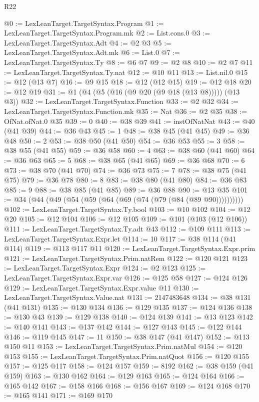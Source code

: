 \begin{lexlean}{R22}
\begin{coremodule}
@0 := LexLeanTarget.TargetSyntax.Program
@1 := LexLeanTarget.TargetSyntax.Program.mk
@2 := List.cons.{0}
@3 := LexLeanTarget.TargetSyntax.Adt
@4 := @2 @3
@5 := LexLeanTarget.TargetSyntax.Adt.mk
@6 := List.{0}
@7 := LexLeanTarget.TargetSyntax.Ty
@8 := @6 @7
@9 := @2 @8
@10 := @2 @7
@11 := LexLeanTarget.TargetSyntax.Ty.nat
@12 := @10 @11
@13 := List.nil.{0}
@15 := @12 (@13 @7)
@16 := @9 @15
@18 := @12 (@12 @15)
@19 := @12 @18
@20 := @12 @19
@31 := @1 (@4 (@5 (@16 (@9 @20 (@9 @18 (@13 @8))))) (@13 @3))
@32 := LexLeanTarget.TargetSyntax.Function
@33 := @2 @32
@34 := LexLeanTarget.TargetSyntax.Function.mk
@35 := Nat
@36 := @2 @35
@38 := OfNat.ofNat.{0} @35
@39 := 0
@40 := @38 @39
@41 := instOfNatNat
@43 := @40 (@41 @39)
@44 := @36 @43
@45 := 1
@48 := @38 @45 (@41 @45)
@49 := @36 @48
@50 := 2
@53 := @38 @50 (@41 @50)
@54 := @36 @53
@55 := 3
@58 := @38 @55 (@41 @55)
@59 := @36 @58
@60 := 4
@63 := @38 @60 (@41 @60)
@64 := @36 @63
@65 := 5
@68 := @38 @65 (@41 @65)
@69 := @36 @68
@70 := 6
@73 := @38 @70 (@41 @70)
@74 := @36 @73
@75 := 7
@78 := @38 @75 (@41 @75)
@79 := @36 @78
@80 := 8
@83 := @38 @80 (@41 @80)
@84 := @36 @83
@85 := 9
@88 := @38 @85 (@41 @85)
@89 := @36 @88
@90 := @13 @35
@101 := @34 (@44 (@49 (@54 (@59 (@64 (@69 (@74 (@79 (@84 (@89 @90))))))))))
@102 := LexLeanTarget.TargetSyntax.Ty.bool
@103 := @10 @102
@104 := @12 @20
@105 := @12 @104
@106 := @12 @105
@109 := @101 (@103 (@12 @106))
@111 := LexLeanTarget.TargetSyntax.Ty.adt @43
@112 := @109 @111
@113 := LexLeanTarget.TargetSyntax.Expr.let
@114 := 10
@117 := @38 @114 (@41 @114)
@119 := @113 @117 @11
@120 := LexLeanTarget.TargetSyntax.Expr.prim
@121 := LexLeanTarget.TargetSyntax.Prim.natRem
@122 := @120 @121
@123 := LexLeanTarget.TargetSyntax.Expr
@124 := @2 @123
@125 := LexLeanTarget.TargetSyntax.Expr.var
@126 := @125 @58
@127 := @124 @126
@129 := LexLeanTarget.TargetSyntax.Expr.value @11
@130 := LexLeanTarget.TargetSyntax.Value.nat
@131 := 2147483648
@134 := @38 @131 (@41 @131)
@135 := @130 @134
@136 := @129 @135
@137 := @124 @136
@138 := @130 @43
@139 := @129 @138
@140 := @124 @139
@141 := @13 @123
@142 := @140 @141
@143 := @137 @142
@144 := @127 @143
@145 := @122 @144
@146 := @119 @145
@147 := 11
@150 := @38 @147 (@41 @147)
@152 := @113 @150 @11
@153 := LexLeanTarget.TargetSyntax.Prim.natMul
@154 := @120 @153
@155 := LexLeanTarget.TargetSyntax.Prim.natQuot
@156 := @120 @155
@157 := @125 @117
@158 := @124 @157
@159 := 8192
@162 := @38 @159 (@41 @159)
@163 := @130 @162
@164 := @129 @163
@165 := @124 @164
@166 := @165 @142
@167 := @158 @166
@168 := @156 @167
@169 := @124 @168
@170 := @165 @141
@171 := @169 @170

\end{coremodule}
\end{lexlean}
